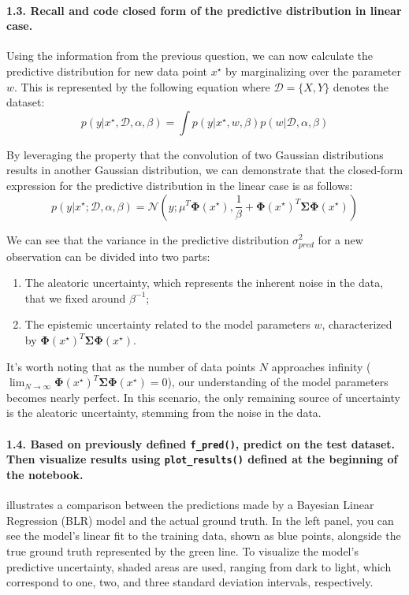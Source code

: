 \paragraph*{1.3. Recall and code closed form of the predictive distribution in linear case.}
Using the information from the previous question, we can now calculate the predictive distribution for new data point $x^\star$ by marginalizing over the parameter $w$. This is represented by the following equation where $\mathcal{D} = \{X,Y\}$ denotes the dataset:
\[ p(y|x^\star , \mathcal{D}, \alpha, \beta ) = \int p(y| x^\star, w, \beta)p(w| \mathcal{D}, \alpha, \beta ) \]

By leveraging the property that the convolution of two Gaussian distributions results in another Gaussian distribution, we can demonstrate that the closed-form expression for the predictive distribution in the linear case is as follows:
\[ p\left(y|x^\star; \mathcal{D}, \alpha, \beta\right) = \mathcal{N}\left(y; \mu^T \boldsymbol{\Phi}(x^\star), \frac{1}{\beta} + \boldsymbol{\Phi}(x^\star)^T \boldsymbol{\Sigma} \boldsymbol{\Phi}(x^\star)\right) \]

We can see that the variance in the predictive distribution $ \sigma ^2_{pred} $  for a new observation can be divided into two parts:
\begin{enumerate}
    \item The aleatoric uncertainty, which represents the inherent noise in the data, that we fixed around $ \beta ^{-1}$;
    \item The epistemic uncertainty related to the model parameters $ w $, characterized by $\boldsymbol{\Phi}(x^\star)^T \boldsymbol{\Sigma} \boldsymbol{\Phi}(x^\star).$
\end{enumerate}
It's worth noting that as the number of data points $N$ approaches infinity ($ \lim_{N \to \infty} \boldsymbol{\Phi}(x^\star)^T \boldsymbol{\Sigma} \boldsymbol{\Phi}(x^\star) = 0 $), our understanding of the model parameters becomes nearly perfect. In this scenario, the only remaining source of uncertainty is the aleatoric uncertainty, stemming from the noise in the data.

\paragraph*{1.4. Based on previously defined \texttt{f\_pred()}, predict on the test dataset. Then visualize results using \texttt{plot\_results()} defined at the beginning of the notebook.}
 illustrates a comparison between the predictions made by a Bayesian Linear Regression (BLR) model and the actual ground truth. In the left panel, you can see the model's linear fit to the training data, shown as blue points, alongside the true ground truth represented by the green line. To visualize the model's predictive uncertainty, shaded areas are used, ranging from dark to light, which correspond to one, two, and three standard deviation intervals, respectively.

